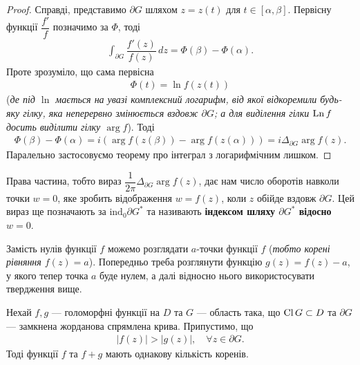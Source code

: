 \documentclass{math_library}
\begin{document}
\begin{proof}
Справді, представимо $\partial G$ шляхом $z = z(t)$ для $t \in [\alpha,\beta]$. Первісну функції $\dfrac{f'}{f}$ позначимо за $\Phi$, тоді
\begin{align*}
\int_{\partial G} \dfrac{f'(z)}{f(z)}\,dz = \Phi(\beta) - \Phi(\alpha).
\end{align*}
Проте зрозуміло, що сама первісна
\begin{align*}
\Phi(t)= \ln f(z(t))
\end{align*}
(\textit{де під $\ln$ мається на увазі комплексний логарифм, від якої відкоремили будь-яку гілку, яка неперервно змінюється вздовж $\partial G$; а для виділення гілки $\operatorname{Ln} f$ досить виділити гілку $\arg f$}). Тоді
\begin{align*}
\Phi(\beta) - \Phi(\alpha) = i(\arg f(z(\beta)) - \arg f(z(\alpha))) = i \Delta_{\partial G} \arg f(z).
\end{align*}
Паралельно застосовуємо теорему про інтеграл з логарифмічним лишком.
\end{proof}

\begin{remark}
Права частина, тобто вираз $\dfrac{1}{2 \pi} \Delta_{\partial G} \arg f(z)$, дає нам число оборотів навколи точки $w = 0$, яке зробить відображення $w = f(z)$, коли $z$ обійде вздовж $\partial G$. Цей вираз ще позначають за $\text{ind}_0 \partial G^*$ та називають \textbf{індексом шляху $\partial G^*$ відосно $w = 0$}.
\end{remark}

\begin{remark}
Замість нулів функції $f$ можемо розглядати $a$-точки функції $f$ (\textit{тобто корені рівняння $f(z) = a$}). Попередньо треба розглянути функцію $g(z) = f(z) - a$, у якого тепер точка $a$ буде нулем, а далі відносно нього використосувати твердження вище.
\end{remark}

\begin{theorem}
Нехай $f,g$ --- голоморфні функції на $D$ та $G$ --- область така, що $\operatorname{Cl} G \subset D$ та $\partial G$ --- замкнена жорданова спрямлена крива. Припустимо, що
\begin{align*}
|f(z)| > |g(z)|,\quad \forall z \in \partial G.
\end{align*}
Тоді функції $f$ та $f+g$ мають однакову кількість коренів.
\end{theorem}
\end{document}

